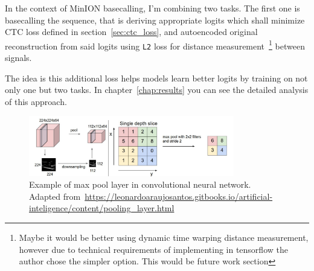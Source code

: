 \documentclass[times, utf8, diplomski, english]{fer}
\begin{document}
In the context of MinION basecalling, I'm combining two tasks. 
The first one is basecalling the sequence, that is deriving appropriate logits which shall minimize CTC loss defined in section~\ref{sec:ctc_loss}, and autoencoded original reconstruction from said logits using \texttt{L2} loss for distance measurement~\footnote{Maybe it would be better using dynamic time warping distance measurement, however due to technical requirements of implementing in tensorflow the author chose the simpler option. This would be future work section} between signals. 

The idea is this additional loss helps models learn better logits by training on not only one but two tasks. In chapter~\ref{chap:results} you can see the detailed analysis of this approach.

\begin{figure}[!ht]
    \begin{center}
        \includegraphics[width=0.8\textwidth]{Pooling_Simple_max}
        \caption{Example of max pool layer in convolutional neural network. Adapted from~\url{https://leonardoaraujosantos.gitbooks.io/artificial-inteligence/content/pooling_layer.html}}
        \label{fg:maxpool}
    \end{center}
\end{figure}

\end{document}
